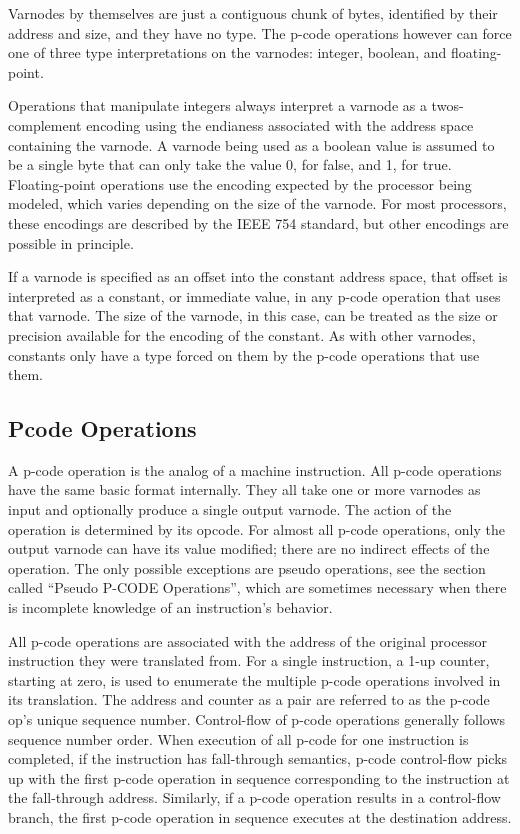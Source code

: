Varnodes by themselves are just a contiguous chunk of bytes, identified by their address and size, and they have no type. The p-code operations however can force one of three type interpretations on the varnodes: integer, boolean, and floating-point.

Operations that manipulate integers always interpret a varnode as a twos-complement encoding using the endianess associated with the address space containing the varnode.
A varnode being used as a boolean value is assumed to be a single byte that can only take the value 0, for false, and 1, for true.
Floating-point operations use the encoding expected by the processor being modeled, which varies depending on the size of the varnode. For most processors, these encodings are described by the IEEE 754 standard, but other encodings are possible in principle.

If a varnode is specified as an offset into the constant address space, that offset is interpreted as a constant, or immediate value, in any p-code operation that uses that varnode. The size of the varnode, in this case, can be treated as the size or precision available for the encoding of the constant. As with other varnodes, constants only have a type forced on them by the p-code operations that use them. 

\subsection{Pcode Operations}
A p-code operation is the analog of a machine instruction. All p-code operations have the same basic format internally. They all take one or more varnodes as input and optionally produce a single output varnode. The action of the operation is determined by its opcode. For almost all p-code operations, only the output varnode can have its value modified; there are no indirect effects of the operation. The only possible exceptions are pseudo operations, see the section called “Pseudo P-CODE Operations”, which are sometimes necessary when there is incomplete knowledge of an instruction's behavior.

All p-code operations are associated with the address of the original processor instruction they were translated from. For a single instruction, a 1-up counter, starting at zero, is used to enumerate the multiple p-code operations involved in its translation. The address and counter as a pair are referred to as the p-code op's unique sequence number. Control-flow of p-code operations generally follows sequence number order. When execution of all p-code for one instruction is completed, if the instruction has fall-through semantics, p-code control-flow picks up with the first p-code operation in sequence corresponding to the instruction at the fall-through address. Similarly, if a p-code operation results in a control-flow branch, the first p-code operation in sequence executes at the destination address.

